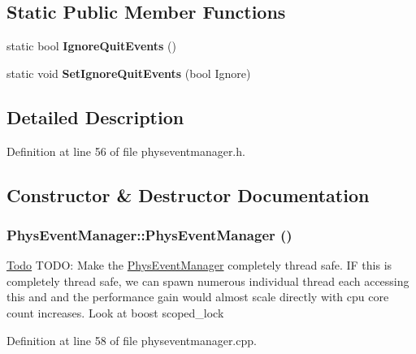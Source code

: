 \subsection*{Static Public Member Functions}
\begin{DoxyCompactItemize}
\item 
\hypertarget{classPhysEventManager_a9783a16342acd71c9a11ade41a2e226b}{
static bool {\bfseries IgnoreQuitEvents} ()}
\label{d5/dd7/classPhysEventManager_a9783a16342acd71c9a11ade41a2e226b}

\item 
\hypertarget{classPhysEventManager_acc902586015a3cd903d14cb20cd51386}{
static void {\bfseries SetIgnoreQuitEvents} (bool Ignore)}
\label{d5/dd7/classPhysEventManager_acc902586015a3cd903d14cb20cd51386}

\end{DoxyCompactItemize}


\subsection{Detailed Description}


Definition at line 56 of file physeventmanager.h.

\subsection{Constructor \& Destructor Documentation}
\hypertarget{classPhysEventManager_a217e7f6006aaf5e08e2872fa4d66e5e2}{
\subsubsection[{PhysEventManager}]{\setlength{\rightskip}{0pt plus 5cm}PhysEventManager::PhysEventManager ()}}
\label{d5/dd7/classPhysEventManager_a217e7f6006aaf5e08e2872fa4d66e5e2}
\begin{Desc}
\item[\hyperlink{todo__todo000005}{Todo}]TODO: Make the \hyperlink{classPhysEventManager}{PhysEventManager} completely thread safe. IF this is completely thread safe, we can spawn numerous individual thread each accessing this and and the performance gain would almost scale directly with cpu core count increases. Look at boost scoped\_\-lock \end{Desc}


Definition at line 58 of file physeventmanager.cpp.

